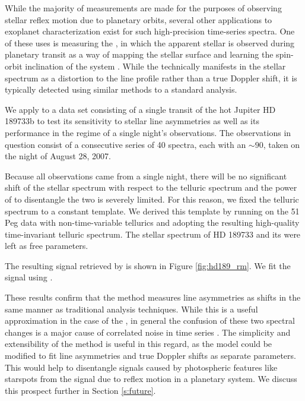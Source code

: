 \documentclass[modern]{aastex62}
\begin{document}
While the majority of \EPRV measurements are made for the purposes of observing stellar reflex motion due to planetary orbits, several other applications to exoplanet characterization exist for such high-precision time-series spectra. 
One of these uses is measuring the \RM, in which the apparent stellar \RV is observed during planetary transit as a way of mapping the stellar surface and learning the spin-orbit inclination of the system \citep[e.g.][]{Queloz2000, Winn2005}. 
While the \RM technically manifests in the stellar spectrum as a distortion to the line profile rather than a true Doppler shift, it is typically detected using similar methods to a standard \RV analysis. 

We apply \wobble to a data set consisting of a single transit of the hot Jupiter HD 189733b to test its sensitivity to stellar line asymmetries as well as its performance in the regime of a single night's observations. 
The observations in question consist of a consecutive series of 40 spectra, each with an \SNR $\sim 90$, taken on the night of August 28, 2007.

Because all observations came from a single night, there will be no significant shift of the stellar spectrum with respect to the telluric spectrum and the power of \wobble to disentangle the two is severely limited. 
For this reason, we fixed the telluric spectrum to a constant template. 
We derived this template by running \wobble on the 51 Peg data with non-time-variable tellurics and adopting the resulting high-quality time-invariant telluric spectrum. 
The stellar spectrum of HD 189733 and its \RVs were left as free parameters.

The resulting \RV signal retrieved by \wobble is shown in Figure \ref{fig:hd189_rm}. 
We fit the signal using \starry \citep{Luger2018}.  

These results confirm that the \wobble method measures line asymmetries as \RV shifts in the same manner as traditional \RV analysis techniques. 
While this is a useful approximation in the case of the \RM, in general the confusion of these two spectral changes is a major cause of correlated noise in \RV time series \citep[e.g.][]{}. 
The simplicity and extensibility of the \wobble method is useful in this regard, as the model could be modified to fit line asymmetries and true Doppler shifts as separate parameters. 
This would help to disentangle signals caused by photospheric features like starspots from the \RV signal due to reflex motion in a planetary system. 
We discuss this prospect further in Section \ref{s:future}.
\end{document}

